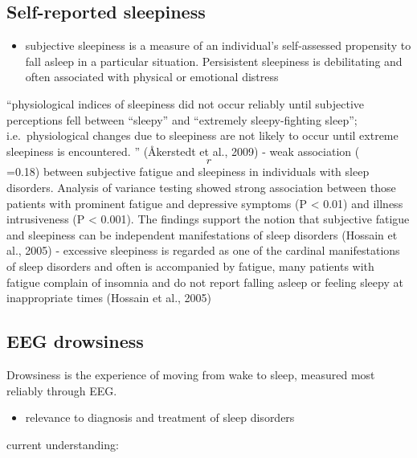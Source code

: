 \documentclass[
]{article}
\providecommand{\tightlist}{%
  \setlength{\itemsep}{0pt}\setlength{\parskip}{0pt}}
\begin{document}
\subsection{Self-reported sleepiness}\label{self-reported-sleepiness}

\begin{itemize}
\tightlist
\item
  subjective sleepiness is a measure of an individual's self-assessed
  propensity to fall asleep in a particular situation. Persisistent
  sleepiness is debilitating and often associated with physical or
  emotional distress
\end{itemize}

``physiological indices of sleepiness did not occur reliably until
subjective perceptions fell between ``sleepy'' and ``extremely
sleepy-fighting sleep''; i.e.~physiological changes due to sleepiness
are not likely to occur until extreme sleepiness is encountered. ''
(Åkerstedt et al., 2009) - weak association (\[r\]=0.18) between
subjective fatigue and sleepiness in individuals with sleep disorders.
Analysis of variance testing showed strong association between those
patients with prominent fatigue and depressive symptoms (P \textless{}
0.01) and illness intrusiveness (P \textless{} 0.001). The findings
support the notion that subjective fatigue and sleepiness can be
independent manifestations of sleep disorders (Hossain et al., 2005) -
excessive sleepiness is regarded as one of the cardinal manifestations
of sleep disorders and often is accompanied by fatigue, many patients
with fatigue complain of insomnia and do not report falling asleep or
feeling sleepy at inappropriate times (Hossain et al., 2005)

\subsection{EEG drowsiness}\label{eeg-drowsiness}

Drowsiness is the experience of moving from wake to sleep, measured most
reliably through EEG.

\begin{itemize}
\tightlist
\item
  relevance to diagnosis and treatment of sleep disorders
\end{itemize}

current understanding:
\end{document}
